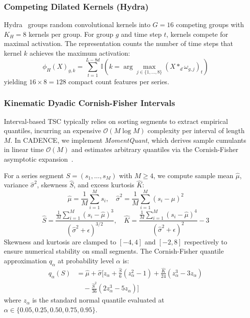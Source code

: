 \documentclass[journal,twocolumn]{article}
\begin{document}
\subsubsection{Competing Dilated Kernels (Hydra)}
Hydra~\cite{dempster2023hydra} groups random convolutional kernels into $G = 16$ competing groups with $K_H = 8$ kernels per group. For group $g$ and time step $t$, kernels compete for maximal activation. The representation counts the number of time steps that kernel $k$ achieves the maximum activation:
\begin{equation}
    \phi_{H}(X)_{g, k} = \sum_{t=1}^{L - 8d} \mathbb{I}\left( k = \arg\max_{j \in \{1,\dots,8\}} (X *_{d} \omega_{g, j})_t \right)
    \label{eq:hydra}
\end{equation}
yielding $16 \times 8 = 128$ compact count features per series.

\subsubsection{Kinematic Dyadic Cornish-Fisher Intervals}
Interval-based TSC typically relies on sorting segments to extract empirical quantiles, incurring an expensive $\mathcal{O}(M \log M)$ complexity per interval of length $M$. In CADENCE, we implement \textit{MomentQuant}, which derives sample cumulants in linear time $\mathcal{O}(M)$ and estimates arbitrary quantiles via the Cornish-Fisher asymptotic expansion~\cite{cornish1938moments}.

For a series segment $S = (s_1, \dots, s_M)$ with $M \ge 4$, we compute sample mean $\hat{\mu}$, variance $\hat{\sigma}^2$, skewness $\hat{S}$, and excess kurtosis $\hat{K}$:
\begin{equation}
    \hat{\mu} = \frac{1}{M}\sum_{i=1}^M s_i, \quad \hat{\sigma}^2 = \frac{1}{M}\sum_{i=1}^M (s_i - \hat{\mu})^2
\end{equation}
\begin{equation}
    \hat{S} = \frac{\frac{1}{M}\sum_{i=1}^M (s_i - \hat{\mu})^3}{(\hat{\sigma}^2 + \epsilon)^{3/2}}, \quad \hat{K} = \frac{\frac{1}{M}\sum_{i=1}^M (s_i - \hat{\mu})^4}{(\hat{\sigma}^2 + \epsilon)^2} - 3
\end{equation}
Skewness and kurtosis are clamped to $[-4, 4]$ and $[-2, 8]$ respectively to ensure numerical stability on small segments. The Cornish-Fisher quantile approximation $q_\alpha$ at probability level $\alpha$ is:
\begin{align}
    q_\alpha(S) &= \hat{\mu} + \hat{\sigma} \Bigg[ z_\alpha + \frac{\hat{S}}{6}(z_\alpha^2 - 1) + \frac{\hat{K}}{24}(z_\alpha^3 - 3z_\alpha) \nonumber \\
    &\quad - \frac{\hat{S}^2}{36}(2z_\alpha^3 - 5z_\alpha) \Bigg]
    \label{eq:cornish_fisher}
\end{align}
where $z_\alpha$ is the standard normal quantile evaluated at $\alpha \in \{0.05, 0.25, 0.50, 0.75, 0.95\}$.
\end{document}
